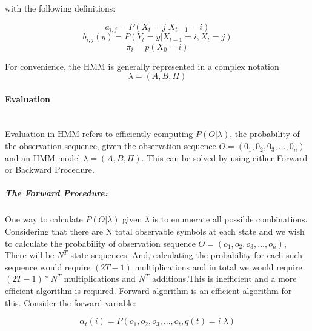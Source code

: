 with the following definitions:

\begin{equation} a _{i,j} = P(X _{t} = j | X _{t-1} = i ) \end{equation}
\begin{equation} b _{i,j}(y) = P(Y _{t} = y | X _{t-1} = i ,  X _{t} = j ) \end{equation}
\begin{equation} \pi _{i} = p(X _{0} = i) \end{equation}

For convenience, the HMM is generally represented in a complex notation
\begin{equation} \lambda = (A,B, \Pi ) \end{equation}

\paragraph{Evaluation} \mbox{}\\
Evaluation in HMM refers to efficiently computing $ P(O|\lambda) $, the probability of the observation sequence, given the observation sequence $ O = (0 _{1}, 0 _{2},0 _{3},...,0 _{n}) $ and an HMM model $ \lambda = (A,B, \Pi ) $. This can be solved by using either Forward or Backward Procedure.
\subparagraph{The Forward Procedure:}
One way to calculate $ P(O|\lambda) $ given $ \lambda $ is to enumerate all possible combinations. Considering that there are N total observable symbols at each state and we
wish to calculate the probability of observation sequence $ O = (o _{1}, o _{2},o _{3},...,o _{n}) $, There will be $ N^{T} $ state sequences. And, calculating the probability for each such sequence would require $(2T -1)$ multiplications and in total we would require $(2T -1) * N^{T} $ multiplications and $ N^{T} $ additions.This is inefficient and a more efficient algorithm is required. Forward algorithm is
an efficient algorithm for this. Consider the forward variable: 

\begin{equation} \alpha _{t} (i) = P(o _{1}, o _{2},o _{3},...,o _{t},q(t) = i|\lambda)  \end{equation}

